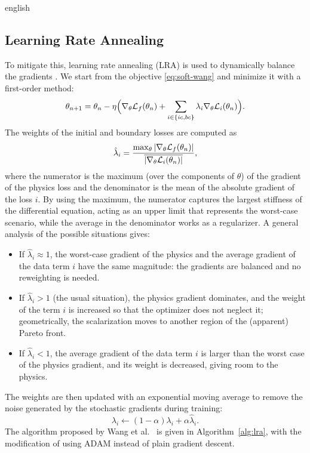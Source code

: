 \documentclass[0000.tex]{subfiles}
\begin{document}
\begin{hyphenrules}{english}
\subsection{Learning Rate Annealing}\label{subsec:lra}

To mitigate this, learning rate annealing (LRA) is used to dynamically balance the gradients
\cite{wang2021gradient}. We start from the objective \eqref{eq:soft-wang} and minimize it with a
first-order method:
\begin{equation}
  \theta_{n+1}=\theta_n-\eta\Big(\nabla_\theta\mathcal{L}_f(\theta_n)+\sum_{i\in\{ic,bc\}}\lambda_i\nabla_\theta\mathcal{L}_i(\theta_n)\Big).
  \label{eq:lra-update}
\end{equation}
The weights of the initial and boundary losses are computed as
\begin{equation}
  \hat\lambda_i=\frac{\max_\theta\left\lvert \nabla_\theta\mathcal{L}_f(\theta_n) \right\rvert}{\overline{\left\lvert \nabla_\theta\mathcal{L}_i(\theta_n) \right\rvert}},
  \label{eq:lra-weights}
\end{equation}
where the numerator is the maximum (over the components of $\theta$) of the gradient of the physics loss
and the denominator is the mean of the absolute gradient of the loss $i$. By using the maximum, the numerator
captures the largest stiffness of the differential equation, acting as an upper limit that represents the
worst-case scenario, while the average in the denominator works as a regularizer. A general analysis of
the possible situations gives:
\begin{itemize}
  \item If $\hat\lambda_i\approx1$, the worst-case gradient of the physics and the average gradient of
    the data term $i$ have the same magnitude: the gradients are balanced and no reweighting is needed.
  \item If $\hat\lambda_i>1$ (the usual situation), the physics gradient dominates, and the weight of
    the term $i$ is increased so that the optimizer does not neglect it; geometrically, the
    scalarization moves to another region of the (apparent) Pareto front.
  \item If $\hat\lambda_i<1$, the average gradient of the data term $i$ is larger than the worst case of
    the physics gradient, and its weight is decreased, giving room to the physics.
\end{itemize}
The weights are then updated with an exponential moving average to remove the noise generated by the
stochastic gradients during training:
\begin{equation}
  \lambda_i\leftarrow(1-\alpha)\lambda_i+\alpha\hat\lambda_i.
  \label{eq:lra-ema}
\end{equation}
The algorithm proposed by Wang et al.~\cite{wang2021gradient} is given in Algorithm~\ref{alg:lra}, with the modification
of using ADAM instead of plain gradient descent.


\end{hyphenrules}
\end{document}
